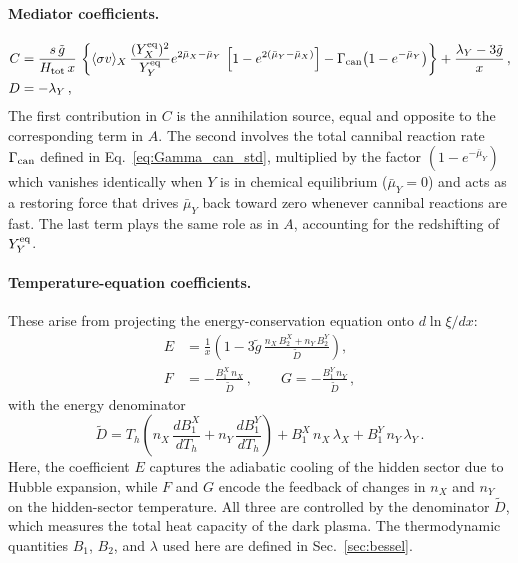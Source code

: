 \paragraph{Mediator coefficients.}
%
\begin{align}
  C &= \frac{s\,\tilde g}{H_{\rm tot}\,x}\,\left\{
       \langle\sigma v\rangle_{X}\, \frac{(Y^{\rm eq}_X)^2}{Y^{\rm eq}_Y}e^{2\bar\mu_X-\bar\mu_Y}\,\left[1-e^{2(\bar\mu_Y-\bar\mu_X)}\right]
       - \Gamma_{\rm can}\bigl(1 - e^{-\bar\mu_Y}\bigr)\right\}
       + \frac{\lambda_Y - 3\tilde g}{x}\,,
  \label{eq:Ccoeff}
  \\
  D &= -\lambda_Y\,,
  \label{eq:Dcoeff}
\end{align}
The first contribution in $C$ is the annihilation source, equal and opposite to the corresponding term in $A$. The second involves the total cannibal reaction rate $\Gamma_{\rm can}$ defined in Eq.~\eqref{eq:Gamma_can_std}, multiplied by the factor $(1 - e^{-\bar\mu_Y})$ which vanishes identically when $Y$ is in chemical equilibrium ($\bar\mu_Y = 0$) and acts as a restoring force that drives $\bar\mu_Y$ back toward zero whenever cannibal reactions are fast. The last term plays the same role as in $A$, accounting for the redshifting of $Y_Y^{\rm eq}$.
 
\paragraph{Temperature-equation coefficients.}
These arise from projecting the energy-conservation equation onto
$d\ln\xi/dx$:
%
\begin{align}
  E &= \frac{1}{x}
       \left(1 - 3\tilde g\,
             \frac{n_X\,B_2^X + n_Y\,B_2^Y}{\tilde D}
       \right),
  \label{eq:Ecoeff}
  \\
  F &= -\frac{B_1^X\,n_X}{\tilde D}\,,
  \qquad
  G = -\frac{B_1^Y\,n_Y}{\tilde D}\,,
  \label{eq:Gcoeff}
\end{align}
%
with the energy denominator
\begin{equation}
  \tilde D
  = T_h\!\left(
      n_X\,\frac{dB_1^X}{dT_h}
    + n_Y\,\frac{dB_1^Y}{dT_h}
    \right)
  + B_1^X\,n_X\,\lambda_X
  + B_1^Y\,n_Y\,\lambda_Y\,.
  \label{eq:Dtilde}
\end{equation}
%
Here, the coefficient $E$ captures the adiabatic cooling of the hidden sector due to Hubble expansion, while $F$ and $G$ encode the feedback of changes in $n_X$ and $n_Y$ on the hidden-sector temperature. All three are controlled by the denominator $\tilde D$, which measures the total heat capacity of the dark plasma. The thermodynamic quantities $B_1$, $B_2$, and $\lambda$ used here are defined
in Sec.~\ref{sec:bessel}.


